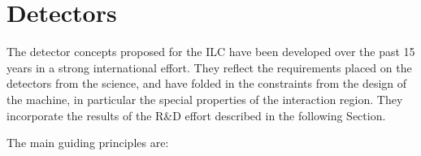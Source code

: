 \documentclass[%
 reprint,
 amsmath,amssymb,
 aps,
]{revtex4-1}
\newcommand{\todo}[1]{\textcolor{red}{{#1}}}
\begin{document}

\vspace{-.4cm}

\section{\label{sec:detect} Detectors}

\vspace{-.3cm}



The detector concepts proposed for the ILC have been developed over
the past 15 years in a strong international effort. They reflect the
requirements placed on the detectors from the science, and have folded
in the constraints from the design of the machine, in particular the
special properties of the 
interaction region.  They incorporate 
 the results of  the R\&D effort described in the following Section.

The main guiding principles are: 
\end{document}
